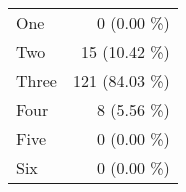 \begin{tabular}{ l  r }
One & 0 (0.00 \%)\\
Two & 15 (10.42 \%)\\
Three & 121 (84.03 \%)\\
Four & 8 (5.56 \%)\\
Five & 0 (0.00 \%)\\
Six & 0 (0.00 \%)\\
\end{tabular}